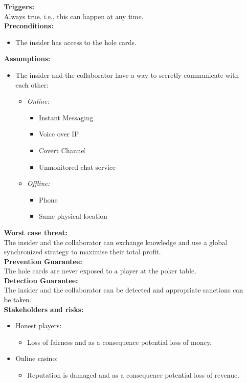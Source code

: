\documentclass[a4paper,11pt]{report}
\begin{document}
\textbf{Triggers:}\\
Always true, i.e., this can happen at any time. \\
\textbf{Preconditions:}
\begin{itemize}
\item The insider has access to the hole cards.
\end{itemize}
\textbf{Assumptions:}
\begin{itemize}
\item The insider and the collaborator have a way to secretly communicate with each other:
\begin{itemize}
\item \emph{Online:}
\begin{itemize}
\item Instant Messaging
\item Voice over IP
\item Covert Channel
\item Unmonitored chat service
\end{itemize}
\item \emph{Offline:}
\begin{itemize}
\item Phone
\item Same physical location
\end{itemize}
\end{itemize}
\end{itemize}
\textbf{Worst case threat:}\\
The insider and the collaborator can exchange knowledge and use a global synchronized strategy to maximise their total profit. \\
\textbf{Prevention Guarantee:} \\
The hole cards are never exposed to a player at the poker table. \\
\textbf{Detection Guarantee:} \\
The insider and the collaborator can be detected and appropriate sanctions can be taken. \\
\textbf{Stakeholders and risks:}
\begin{itemize}
\item Honest players:
\begin{itemize}
\item Loss of fairness and as a consequence potential loss of money.
\end{itemize}
\item Online casino:
\begin{itemize}
\item Reputation is damaged and as a consequence potential loss of revenue.
\end{itemize}
\end{itemize}
\end{document}
